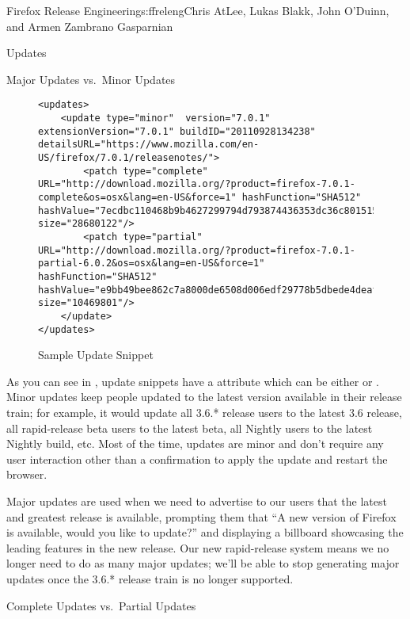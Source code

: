 \begin{aosachapter}{Firefox Release Engineering}{s:ffreleng}{Chris AtLee, Lukas Blakk, John O'Duinn, and Armen Zambrano Gasparnian}
\begin{aosasect1}{Updates}
\begin{aosasect2}{Major Updates vs.\ Minor Updates}

\begin{figure}  
\begin{verbatim}
<updates>
    <update type="minor"  version="7.0.1" extensionVersion="7.0.1" buildID="20110928134238" detailsURL="https://www.mozilla.com/en-US/firefox/7.0.1/releasenotes/">
        <patch type="complete" URL="http://download.mozilla.org/?product=firefox-7.0.1-complete&os=osx&lang=en-US&force=1" hashFunction="SHA512" hashValue="7ecdbc110468b9b4627299794d793874436353dc36c80151550b08830f9d8c5afd7940c51df9270d54e11fd99806f41368c0f88721fa17e01ea959144f473f9d" size="28680122"/>
        <patch type="partial" URL="http://download.mozilla.org/?product=firefox-7.0.1-partial-6.0.2&os=osx&lang=en-US&force=1" hashFunction="SHA512" hashValue="e9bb49bee862c7a8000de6508d006edf29778b5dbede4deaf3cfa05c22521fc775da126f5057621960d327615b5186b27d75a378b00981394716e93fc5cca11a" size="10469801"/>
    </update>
</updates>
\end{verbatim}
\caption{Sample Update Snippet}
\label{fig.ffreleng.snippet}
\end{figure}

As you can see in , update snippets
have a  attribute which can be either  or 
.
Minor updates keep people updated to the latest version
available in their release train; for example, it would update all
3.6.* release users to the latest 3.6 release, all rapid-release beta
users to the latest beta, all Nightly users to the
latest Nightly build, etc.  Most of the time, updates are minor and
don't require any user interaction other than a confirmation to apply the
update and restart the browser.

Major updates are used when we need to advertise to our users that the
latest and greatest release is available, prompting them that
``A new version of Firefox is available, would you
like to update?'' and displaying a billboard showcasing the leading 
features in the new release.  Our new rapid-release system means we no
longer need to do as many major updates; we'll be able to stop
generating major updates once the 3.6.* release train is no longer supported.

\end{aosasect2}

\begin{aosasect2}{Complete Updates vs.\ Partial Updates}


\end{aosasect2}
\end{aosasect1}
\end{aosachapter}
